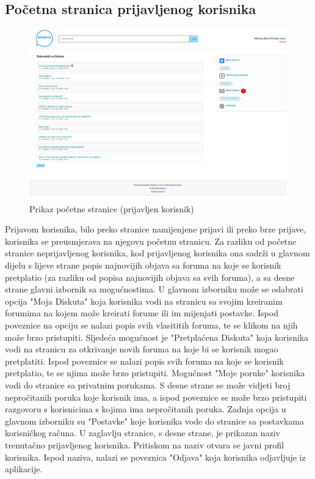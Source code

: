 \documentclass{foi}
\begin{document}
\subsection{Početna stranica prijavljenog korisnika}

\begin{figure}[h!]
    \centering
    \includegraphics[width=1\textwidth]{slike/pocetna-prijavljen.png}
    \caption{Prikaz početne stranice (prijavljen korisnik)}
\end{figure}

Prijavom korisnika, bilo preko stranice namijenjene prijavi ili preko brze prijave, korisnika se preusmjerava na njegovu početnu stranicu. Za razliku od početne stranice neprijavljenog korisnika, kod prijavljenog korisnika ona sadrži u glavnom dijelu s lijeve strane popis najnovijih objava sa foruma na koje se korisnik pretplatio (za razliku od popisa najnovijih objava sa svih foruma), a sa desne strane glavni izbornik sa mogućnostima. U glavnom izborniku može se odabrati opcija "Moja Diskuta" koja korisnika vodi na stranicu sa svojim kreiranim forumima na kojem može kreirati forume ili im mijenjati postavke. Ispod poveznice na opciju se nalazi popis svih vlasititih foruma, te se klikom na njih može brzo pristupiti. Sljedeća mogućnost je "Pretplaćena Diskuta" koja korisnika vodi na stranicu za otkrivanje novih foruma na koje bi se korisnik mogao pretplatiti. Ispod poveznice se nalazi popis svih foruma na koje se korisnik pretplatio, te se njima može brzo pristupiti. Mogućnost "Moje poruke" korisnika vodi do stranice sa privatnim porukama. S desne strane se može vidjeti broj nepročitanih poruka koje korisnik ima, a ispod poveznice se može brzo pristupiti razgovoru s korisnicima s kojima ima nepročitanih poruka. Zadnja opcija u glavnom izborniku su "Postavke" koje korisnika vode do stranice sa postavkama korisničkog računa. U zaglavlju stranice, s desne strane, je prikazan naziv trenutačno prijavljenog korisnika. Pritiskom na naziv otvara se javni profil korisnika. Ispod naziva, nalazi se poveznica "Odjava" koja korisnika odjavljuje iz aplikacije.
\end{document}
